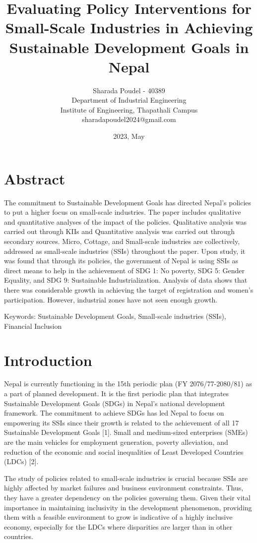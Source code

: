 \documentclass[a4paper]{article}
\title{Evaluating Policy Interventions for \\Small-Scale Industries in Achieving \\Sustainable Development Goals in Nepal}
\date{2023, May}
\author{Sharada Poudel - 40389\\ Department of Industrial Engineering\\ Institute of Engineering, Thapathali Campus\\
sharadapoudel2024@gmail.com}
\begin{document}
\maketitle
 
\section{Abstract}
The commitment to Sustainable Development Goals has directed Nepal’s policies to put a higher focus on small-scale industries. The paper includes qualitative and quantitative analyses of the impact of the policies. Qualitative analysis was carried out through KIIs and Quantitative analysis was carried out through secondary sources. Micro, Cottage, and Small-scale industries are collectively, addressed as small-scale industries (SSIs) throughout the paper. Upon study, it was found that through its policies, the government of Nepal is using SSIs as direct means to help in the achievement of SDG 1: No poverty, SDG 5: Gender Equality, and SDG 9: Sustainable Industrialization. Analysis of data shows that there was considerable growth in achieving the target of registration and women’s participation. However, industrial zones have not seen enough growth.

Keywords: Sustainable Development Goals, Small-scale industries (SSIs), Financial Inclusion

\section{Introduction}
Nepal is currently functioning in the 15th periodic plan (FY 2076/77-2080/81) as a part of planned development. It is the first periodic plan that integrates Sustainable Development Goals (SDGs) in Nepal’s national development framework. The commitment to achieve SDGs has led Nepal to focus on empowering its SSIs since their growth is related to the achievement of all 17 Sustainable Development Goals [1]. Small and medium-sized enterprises (SMEs) are the main vehicles for employment generation, poverty alleviation, and reduction of the economic and social inequalities of Least Developed Countries (LDCs) [2].

The study of policies related to small-scale industries is crucial because SSIs are highly affected by market failures and business environment constraints. Thus, they have a greater dependency on the policies governing them. Given their vital importance in maintaining inclusivity in the development phenomenon, providing them with a feasible environment to grow is indicative of a highly inclusive economy, especially for the LDCs where disparities are larger than in other countries.
\end{document}
